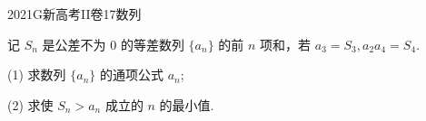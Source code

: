 
\begin{problem}{2021}{G}{新高考II卷}{17}{数列}

记 $S_n$ 是公差不为 0 的等差数列 $\{a_n\}$ 的前 $n$ 项和，若 $a_3=S_3, a_2 a_4=S_4$.

(1) 求数列 $\{a_n\}$ 的通项公式 $a_n$;

(2) 求使 $S_n>a_n$ 成立的 $n$ 的最小值.

\end{problem}